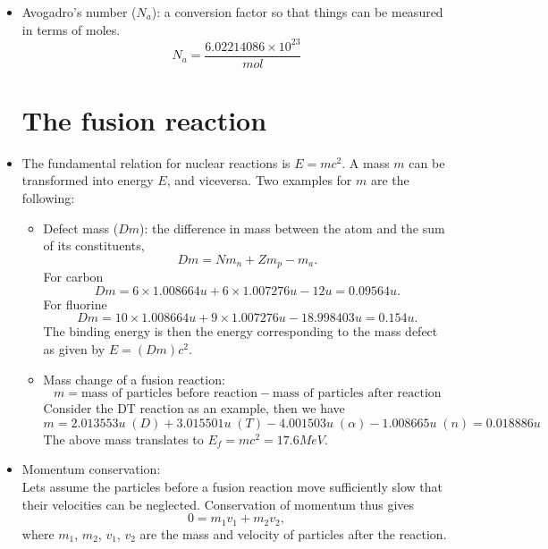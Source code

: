\documentclass[a4paper,11pt]{report}
\begin{document}
\begin{itemize}
\item Avogadro's number ($N_a$): a conversion factor so that things can be measured in terms of moles. 
\begin{equation}
    N_a = \frac{6.02214086 \times 10^{23}}{mol} 
\end{equation}

\section{The fusion reaction}
\item The fundamental relation for nuclear reactions is $E = m c^2$. A mass $m$ can be transformed into energy $E$, and viceversa. Two examples for $m$ are the following:
\begin{itemize}
\item Defect mass ($Dm$): the difference in mass between the atom and the sum of its constituents,
\begin{equation}
Dm = N m_n + Z m_p - m_a.
\end{equation}
For carbon
\begin{equation}
Dm = 6 \times 1.008664 u + 6 \times 1.007276 u - 12u = 0.09564 u.
\end{equation}
For fluorine
\begin{equation}
Dm = 10 \times 1.008664 u + 9 \times 1.007276 u - 18.998403u = 0.154 u.
\end{equation}
The binding energy is then the energy corresponding to the mass defect as given by  $E = (Dm)c^2$.

\item Mass change of a fusion reaction:
\begin{equation}
m = \text{mass of particles before reaction} - \text{mass of particles after reaction} 
\end{equation}
Consider the DT reaction as an example, then we have
\begin{equation}
m = 2.013553u \;(D) + 3.015501u \;(T) - 4.001503u \;(\alpha) - 1.008665u \;(n) = 0.018886u
\end{equation}
The above mass translates to $E_f = mc^2 = 17.6MeV$.
\end{itemize}

\item Momentum conservation:\\
Lets assume the particles before a fusion reaction move sufficiently slow that their velocities can be neglected. Conservation of momentum thus gives
\begin{equation}
0 = m_1 v_1 + m_2 v_2,
\end{equation}
where $m_1$, $m_2$, $v_1$, $v_2$ are the mass and velocity of particles after the reaction.


\end{itemize}
\end{document}
